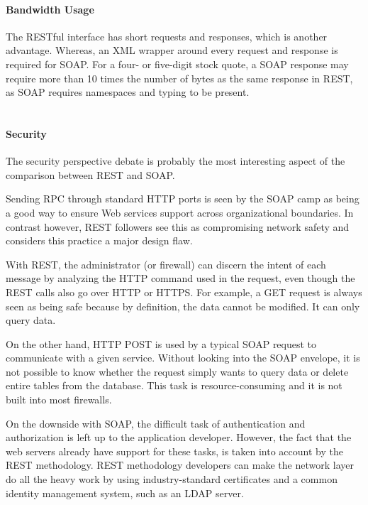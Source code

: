 \paragraph{Bandwidth Usage}

The RESTful interface has short requests and responses, which is another advantage. Whereas, an \ac{XML} wrapper around every request and response is required for \ac{SOAP}. For a four- or five-digit stock quote, a \ac{SOAP} response may require more than 10 times the number of bytes as the same response in \ac{REST}, as \ac{SOAP} requires namespaces and typing to be present. 
\\
\\
\paragraph{Security}
The security perspective debate is probably the most interesting aspect of the comparison between \ac{REST} and \ac{SOAP}. 

Sending \ac{RPC} through standard \ac{HTTP} ports is seen by the \ac{SOAP} camp as being a good way to ensure Web services support across organizational boundaries. In contrast however, \ac{REST} followers see this as compromising network safety and considers this practice a major design flaw.

With \ac{REST}, the administrator (or firewall) can discern the intent of each message by analyzing the \ac{HTTP} command used in the request, even though the \ac{REST} calls also go over \ac{HTTP} or \ac{HTTPS}. For example, a GET request is always seen as being safe because by definition, the data cannot be modified. It can only query data.

On the other hand, \ac{HTTP} POST is used by a typical \ac{SOAP} request to communicate with a given service. Without looking into the \ac{SOAP} envelope, it is not possible to know whether the request simply wants to query data or delete entire tables from the database. This task is resource-consuming and it is not built into most firewalls.

On the downside with \ac{SOAP}, the difficult task of authentication and authorization is left up to the application developer. However, the fact that the web servers already have support for these tasks, is taken into account by the \ac{REST} methodology. \ac{REST} methodology developers can make the network layer do all the heavy work by using industry-standard certificates and a common identity management system, such as an \ac{LDAP} server.

